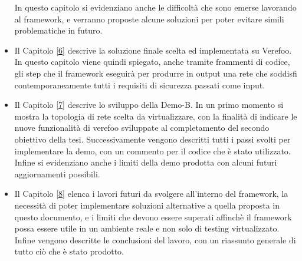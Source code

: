 \begin{itemize}
          In questo capitolo si evidenziano anche le difficoltà che sono emerse lavorando al framework, e verranno proposte alcune soluzioni per poter evitare simili problematiche in futuro.
    \item Il Capitolo \hyperref[ch:intro]{[6]} descrive la soluzione finale scelta ed implementata su Verefoo. In questo capitolo viene quindi spiegato, anche tramite frammenti di codice, gli step
          che il framework eseguirà per produrre in output una rete che soddisfi contemporaneamente tutti i requisiti di sicurezza passati come input. 
    \item Il Capitolo \hyperref[ch:intro]{[7]} descrive lo sviluppo della Demo-B. In un primo momento si mostra la topologia
        di rete scelta da virtualizzare, con la finalità di indicare le nuove funzionalità di verefoo sviluppate al completamento del secondo obiettivo della tesi. Successivamente vengono descritti tutti i passi svolti per implementare la demo, con un commento per il codice che è stato utilizzato. Infine
        si evidenziano anche i limiti della demo prodotta con alcuni  futuri aggiornamenti possibili.
    \item Il Capitolo \hyperref[ch:intro]{[8]} elenca i lavori futuri da svolgere all'interno del framework, la necessità di poter implementare soluzioni
          alternative a quella proposta in questo documento, e i limiti che devono essere superati affinchè il framework possa essere utile in un ambiente reale e non
          solo di testing virtualizzato. Infine vengono descritte le conclusioni del lavoro, con un riassunto generale di tutto ciò che è stato prodotto.
\end{itemize}